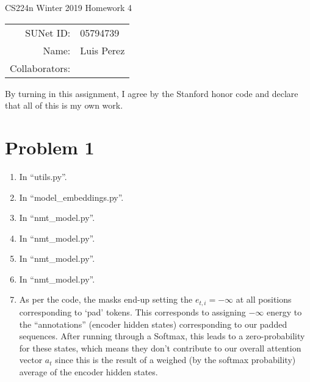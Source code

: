 \documentclass[12pt]{article}
\begin{document}
\begin{center}
{\Large CS224n Winter 2019 Homework 4}

\begin{tabular}{rl}
SUNet ID: & 05794739 \\
Name: & Luis Perez \\
Collaborators: &
\end{tabular}
\end{center}

By turning in this assignment, I agree by the Stanford honor code and declare
that all of this is my own work.

\section*{Problem 1}
\begin{enumerate}[label=(\alph*)]
  \item In ``utils.py''.
  \item In ``model\_embeddings.py''.
  \item In ``nmt\_model.py''.
  \item In ``nmt\_model.py''.
  \item In ``nmt\_model.py''.
  \item In ``nmt\_model.py''.
  \item
    As per the code, the masks end-up setting the $e_{t,i} = -\infty$ at all positions corresponding to `pad' tokens. This corresponds to assigning $-\infty$ energy to the ``annotations'' (encoder hidden states) corresponding to our padded sequences. After running through a Softmax, this leads to a zero-probability for these states, which means they don't contribute to our overall attention vector $a_t$ since this is the result of a weighed (by the softmax probability) average of the encoder hidden states.


\end{enumerate}
\end{document}
